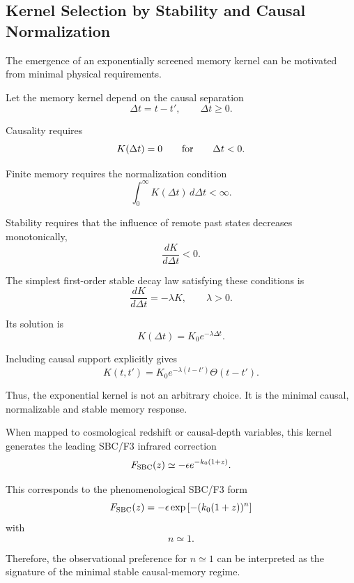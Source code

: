 \subsection{Kernel Selection by Stability and Causal Normalization}

The emergence of an exponentially screened memory kernel can be motivated from minimal physical requirements.

Let the memory kernel depend on the causal separation
\begin{equation}
\Delta t = t-t',
\qquad
\Delta t \geq 0 .
\end{equation}

Causality requires
\begin{equation}
K(\Delta t)=0
\qquad
{\rm for}
\qquad
\Delta t<0 .
\end{equation}

Finite memory requires the normalization condition
\begin{equation}
\int_0^\infty K(\Delta t)\,d\Delta t < \infty .
\end{equation}

Stability requires that the influence of remote past states decreases monotonically,
\begin{equation}
\frac{dK}{d\Delta t}<0 .
\end{equation}

The simplest first-order stable decay law satisfying these conditions is
\begin{equation}
\frac{dK}{d\Delta t}
=
-\lambda K,
\qquad
\lambda>0 .
\end{equation}

Its solution is
\begin{equation}
K(\Delta t)
=
K_0 e^{-\lambda \Delta t}.
\end{equation}

Including causal support explicitly gives
\begin{equation}
K(t,t')
=
K_0 e^{-\lambda(t-t')}
\Theta(t-t') .
\end{equation}

Thus, the exponential kernel is not an arbitrary choice. It is the minimal causal, normalizable and stable memory response.

When mapped to cosmological redshift or causal-depth variables, this kernel generates the leading SBC/F3 infrared correction
\begin{equation}
F_{\rm SBC}(z)
\simeq
-\epsilon e^{-k_0(1+z)} .
\end{equation}

This corresponds to the phenomenological SBC/F3 form
\begin{equation}
F_{\rm SBC}(z)
=
-\epsilon
\exp\left[-(k_0(1+z))^n\right]
\end{equation}
with
\begin{equation}
n\simeq 1 .
\end{equation}

Therefore, the observational preference for \(n\simeq1\) can be interpreted as the signature of the minimal stable causal-memory regime.
